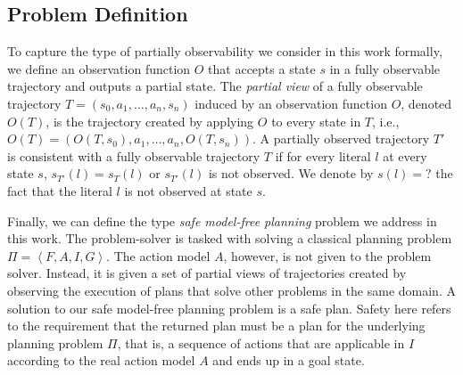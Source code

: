 \documentclass[letterpaper]{article} %
\newcommand{\tuple}[1]{\ensuremath{\left \langle #1 \right \rangle }}
\newcommand{\unobserved}{\textit{?}}
\newcommand{\sam}{\textit{SAM}\xspace}
\newcommand{\roni}[1]{{\textcolor{green}{[Roni: #1]}}}
\begin{document}


\subsection{Problem Definition}

To capture the type of partially observability we consider in this work formally, we define an observation function $O$ that accepts a state $s$ in a fully observable trajectory and outputs a partial state. 
The \emph{partial view} of a fully observable trajectory $T=(s_0,a_1,\ldots,a_n,s_n)$ 
induced by an observation function $O$, denoted $O(T)$, is the trajectory created by applying $O$ to every state in $T$, i.e., $O(T)=\left(O(T,s_0),a_1,\ldots,a_n,O(T,s_n)\right)$. A partially observed trajectory $T'$ is consistent with a fully observable trajectory $T$ if for every literal $l$ at every state $s$, $s_{T'}(l) = s_{T}(l)$ or $s_{T'}(l)$ is not observed.
We denote by $s(l)=\unobserved$ the fact that the literal $l$ is not observed at state $s$. 


Finally, we can define the type \emph{safe model-free planning} problem we address in this work. 
The problem-solver is tasked with solving a classical planning problem $\Pi=\tuple{F,A,I,G}$. 
The action model $A$, however, is not given to the problem solver. 
Instead, it is given a set of partial views of trajectories created by 
observing the execution of plans that solve other problems in the same domain. 
A solution to our safe model-free planning problem is a safe plan. 
Safety here refers to the requirement that the returned plan must be a plan for the  underlying planning problem $\Pi$, that is, a sequence of actions that are applicable in $I$ according to the real action model $A$ and ends up in a goal state. 
\end{document}
